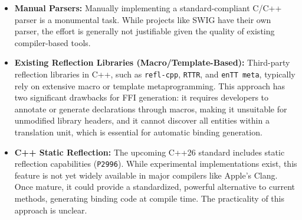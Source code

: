 \begin{itemize}
    \item \textbf{Manual Parsers:} Manually implementing a standard-compliant C/C++ parser is a monumental task. While projects like SWIG have their own parser, the effort is generally not justifiable given the quality of existing compiler-based tools.

    \item \textbf{Existing Reflection Libraries (Macro/Template-Based):} Third-party reflection libraries in C++, such as \texttt{refl-cpp}, \texttt{RTTR}, and \texttt{enTT meta}, typically rely on extensive macro or template metaprogramming. This approach has two significant drawbacks for FFI generation: it requires developers to annotate or generate declarations through macros, making it unsuitable for unmodified library headers, and it cannot discover all entities within a translation unit, which is essential for automatic binding generation.

    \item \textbf{C++ Static Reflection:} The upcoming C++26 standard includes static reflection capabilities (\texttt{P2996}). While experimental implementations exist, this feature is not yet widely available in major compilers like Apple's Clang. Once mature, it could provide a standardized, powerful alternative to current methods, generating binding code at compile time. The practicality of this approach is unclear.
\end{itemize}







